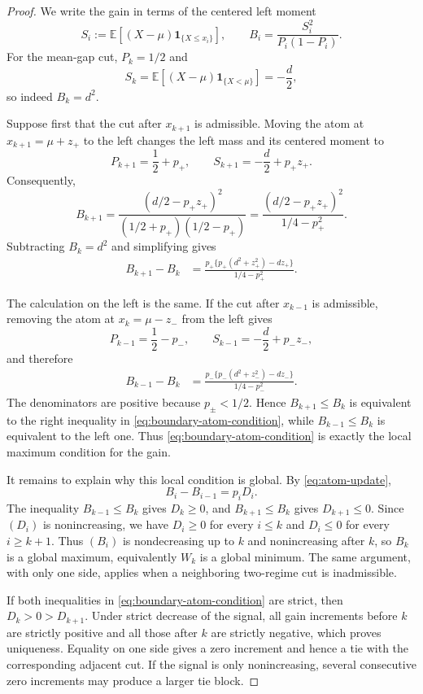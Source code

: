 \documentclass[a4paper]{amsart}
\numberwithin{equation}{section}
\theoremstyle{remark}
\newcommand{\E}{\mathbb E}
\newcommand{\1}{\mathbf 1}
\begin{document}
\begin{proof}
We write the gain in terms of the centered left moment
\[
 S_i:=\E[(X-\mu)\1_{\{X\leq x_i\}}],
 \qquad
 B_i=\frac{S_i^2}{P_i(1-P_i)}.
\]
For the mean-gap cut, $P_k=1/2$ and
\[
 S_k=\E[(X-\mu)\1_{\{X<\mu\}}]=-\frac{d}{2},
\]
so indeed $B_k=d^2$.

Suppose first that the cut after $x_{k+1}$ is admissible.  Moving the atom at
$x_{k+1}=\mu+z_+$ to the left changes the left mass and its centered moment to
\[
 P_{k+1}=\frac12+p_+,\qquad
 S_{k+1}=-\frac d2+p_+z_+.
\]
Consequently,
\[
 B_{k+1}
 =\frac{(d/2-p_+z_+)^2}{(1/2+p_+)(1/2-p_+)}
 =\frac{(d/2-p_+z_+)^2}{1/4-p_+^2}.
\]
Subtracting $B_k=d^2$ and simplifying gives
\begin{align}
 B_{k+1}-B_k
 &=\frac{p_+\{p_+(d^2+z_+^2)-dz_+\}}
         {1/4-p_+^2}.\label{eq:right-atom-correction}
\end{align}

The calculation on the left is the same.  If the cut after $x_{k-1}$ is
admissible, removing the atom at $x_k=\mu-z_-$ from the left gives
\[
 P_{k-1}=\frac12-p_-,\qquad
 S_{k-1}=-\frac d2+p_-z_-,
\]
and therefore
\begin{align}
 B_{k-1}-B_k
 &=\frac{p_-\{p_-(d^2+z_-^2)-dz_-\}}
         {1/4-p_-^2}.\label{eq:left-atom-correction}
\end{align}
The denominators are positive because $p_\pm<1/2$.  Hence
$B_{k+1}\leq B_k$ is equivalent to the right inequality in
\eqref{eq:boundary-atom-condition}, while $B_{k-1}\leq B_k$ is equivalent to
the left one.  Thus \eqref{eq:boundary-atom-condition} is exactly the local
maximum condition for the gain.

It remains to explain why this local condition is global.  By
\eqref{eq:atom-update},
\[
 B_i-B_{i-1}=p_iD_i.
\]
The inequality $B_{k-1}\leq B_k$ gives $D_k\geq0$, and
$B_{k+1}\leq B_k$ gives $D_{k+1}\leq0$.  Since $(D_i)$ is nonincreasing, we
have $D_i\geq0$ for every $i\leq k$ and $D_i\leq0$ for every $i\geq k+1$.
Thus $(B_i)$ is nondecreasing up to $k$ and nonincreasing after $k$, so $B_k$
is a global maximum, equivalently $W_k$ is a global minimum.  The same
argument, with only one side, applies when a neighboring two-regime cut is
inadmissible.

If both inequalities in \eqref{eq:boundary-atom-condition} are strict, then
$D_k>0>D_{k+1}$.  Under strict decrease of the signal, all gain increments
before $k$ are strictly positive and all those after $k$ are strictly
negative, which proves uniqueness.  Equality on one side gives a zero
increment and hence a tie with the corresponding adjacent cut.  If the signal
is only nonincreasing, several consecutive zero increments may produce a
larger tie block.
\end{proof}
\end{document}
